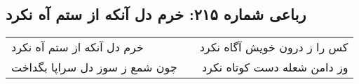 \begin{center}
\section*{رباعی شماره ۲۱۵: خرم دل آنکه از ستم آه نکرد}
\label{sec:sh215}
\begin{longtable}{l p{0.5cm} r}
خرم دل آنکه از ستم آه نکرد
&&
کس را ز درون خویش آگاه نکرد
\\
چون شمع ز سوز دل سراپا بگداخت
&&
وز دامن شعله دست کوتاه نکرد
\\
\end{longtable}
\end{center}
